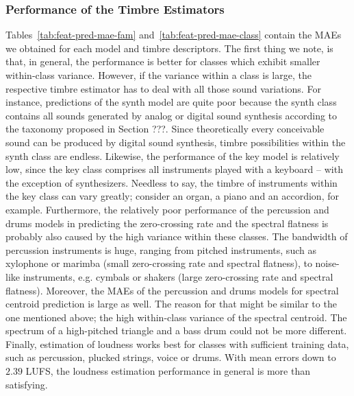 \documentclass{article}
\begin{document}
\subsubsection{Performance of the Timbre Estimators}
\label{sec:experiments:te:performance}
Tables~\ref{tab:feat-pred-mae-fam} and~\ref{tab:feat-pred-mae-class} contain the MAEs we obtained for each model and timbre descriptors. The first thing we note, is that, in general, the performance is better for classes which exhibit smaller within-class variance. However, if the variance within a class is large, the respective timbre estimator has to deal with all those sound variations. For instance, predictions of the synth model are quite poor because the synth class contains all sounds generated by analog or digital sound synthesis according to the taxonomy proposed in Section ???. Since theoretically every conceivable sound can be produced by digital sound synthesis, timbre possibilities within the synth class are endless. Likewise, the performance of the key model is relatively low, since the key class comprises all instruments played with a keyboard -- with the exception of synthesizers. Needless to say, the timbre of instruments within the key class can vary greatly; consider an organ, a piano and an accordion, for example. Furthermore, the relatively poor performance of the percussion and drums models in predicting the zero-crossing rate and the spectral flatness is probably also caused by the high variance within these classes. The bandwidth of percussion instruments is huge, ranging from pitched instruments, such as xylophone or marimba (small zero-crossing rate and spectral flatness), to noise-like instruments, e.g. cymbals or shakers (large zero-crossing rate and spectral flatness). Moreover, the MAEs of the percussion and drums models for spectral centroid prediction is large as well. The reason for that might be similar to the one mentioned above; the high within-class variance of the spectral centroid. The spectrum of a high-pitched triangle and a bass drum could not be more different. Finally, estimation of loudness works best for classes with sufficient training data, such as percussion, plucked strings, voice or drums. With mean errors down to $2.39$ LUFS, the loudness estimation performance in general is more than satisfying.
\end{document}
